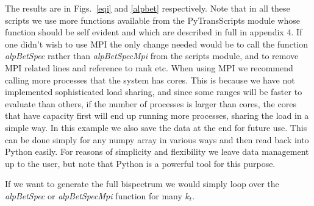 \documentclass[10pt,
amsmath,amssymb,
aps,prd,nofootinbib,eqsecnum,a4paper]{revtex4}
\begin{document}
\noindent The results are in Figs.~\ref{eqi} and \ref{alpbet} respectively. 
Note that in all these scripts we use more functions available from the { PyTransScripts} module whose function 
should be self evident and which are described in full in appendix 4.
If one didn't wish to use MPI the only change needed would be to call the function {\it alpBetSpec} rather than 
{\it alpBetSpecMpi} from the scripts module, and to remove MPI related lines and reference to 
rank etc.
When using MPI we recommend calling more processes 
that the system has cores. This is because we have not implemented sophisticated load sharing, and since 
some ranges will be faster to evaluate than others, if 
the number of processes is larger than cores, the cores that have capacity first will end up running more processes, 
sharing the load in a simple way. In this example we also save the data at the end for future use. This can be done 
simply for any numpy array in various ways and then read back into Python easily. For reasons of simplicity and flexibility 
we leave data management up to the user, but note that Python is a powerful tool for this purpose.


If we want to generate the full bispectrum we would simply loop over the {\it alpBetSpec} or {\it alpBetSpecMpi}
function for many $k_t$.
\end{document}
